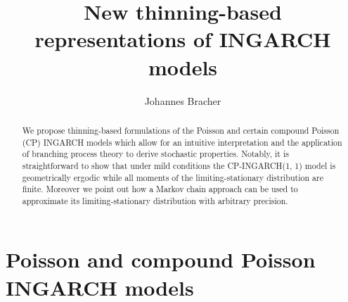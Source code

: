 \documentclass[review]{elsarticle}
\begin{document}
\title{New thinning-based representations of INGARCH models}
\author{Johannes Bracher}
\address{Chair of Statistics and Econometrics, Karlsruhe Institute of Technology, \\ %
Computational Statistics Group, Heidelberg Institute for Theoretical Studies}


\newcommand{\juv}{S}



\begin{abstract}
We propose thinning-based formulations of the Poisson and certain compound Poisson (CP) INGARCH models which allow for an intuitive interpretation and the application of branching process theory to derive stochastic properties. Notably, it is straightforward to show that under mild conditions the CP-INGARCH(1, 1) model is geometrically ergodic while all moments of the limiting-stationary distribution are finite. Moreover we point out how a Markov chain approach can be used to approximate its limiting-stationary distribution with arbitrary precision.
\end{abstract}


\maketitle



\section{Poisson and compound Poisson INGARCH models}
\label{sec:original_formulation}
\end{document}
